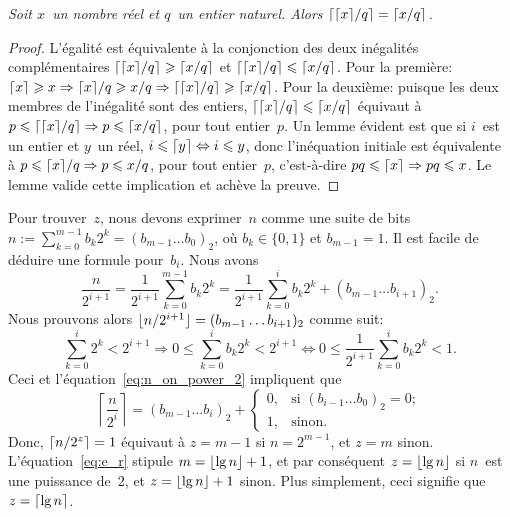 \begin{itemize}
    \medskip

\begin{thm}
\label{thm_ceilings}
\textsl{Soit \(x\)~un nom\-bre réel et \(q\)~un entier naturel. Alors
  \(\lceil{\lceil{x}\rceil/q}\rceil = \lceil{x/q}\rceil\).}
\end{thm}
\begin{proof}
  L'égalité est équivalente à la conjonction des deux inégalités
  complémentaires \(\lceil{\lceil{x}\rceil/q}\rceil \geqslant \lceil{x/q}\rceil\)
  et \(\lceil{\lceil{x}\rceil/q}\rceil \leqslant \lceil{x/q}\rceil\). Pour la
  première: \(\lceil{x}\rceil \geqslant x \Rightarrow \lceil{x}\rceil/q
  \geqslant x/q \Rightarrow \lceil{\lceil{x}\rceil/q}\rceil \geqslant
  \lceil{x/q}\rceil\). Pour la deuxième: puisque les deux membres de
  l'inégalité sont des entiers, \(\lceil{\lceil{x}\rceil/q}\rceil \leqslant
  \lceil{x/q}\rceil\) équivaut à \(p \leqslant \lceil{\lceil{x}\rceil/q}\rceil
  \Rightarrow p \leqslant \lceil{x/q}\rceil\), pour tout entier~\(p\). Un
  lemme évident est que si \(i\)~est un entier et \(y\)~un réel, \(i
  \leqslant \lceil{y}\rceil \Leftrightarrow i \leqslant y\), donc
  l'inéquation initiale est équivalente à \(p \leqslant \lceil{x}\rceil/q
  \Rightarrow p \leqslant x/q\), pour tout entier~\(p\), c'est-à-dire
  \(pq \leqslant \lceil{x}\rceil \Rightarrow pq \leqslant x\). Le lemme
  valide cette implication et achève la preuve.
 \end{proof}
    \noindent Pour trouver~\(z\), nous devons exprimer~\(n\) comme une
    suite de bits \(n :=\! \sum_{k=0}^{m-1}{b_k2^k} = (b_{m-1}\ldots
    b_0)_2\), où \(b_k \in \{0,1\}\) et \(b_{m-1} = 1\). Il est facile
    de déduire une formule pour~\(b_i\). Nous avons
    \begin{equation}
      \frac{n}{2^{i+1}}
      = \frac{1}{2^{i+1}}\sum_{k=0}^{m-1}{b_k2^{k}}
      = \frac{1}{2^{i+1}}\sum_{k=0}^{i}{b_k2^k} + (b_{m-1}\dots b_{i+1})_2.
      \label{eq:n_on_power_2}
    \end{equation}
    Nous prouvons alors \(\lfloor{n/2^{i+1}}\rfloor = (b_{m-1}\dots
    b_{i+1})_2\) comme suit:
    \begin{equation*}
      \sum_{k=0}^{i}{2^k} < 2^{i+1}
      \Rightarrow
      0 \leqslant \sum_{k=0}^{i}{b_k2^k} < 2^{i+1}
      \Leftrightarrow
      0 \leqslant \frac{1}{2^{i+1}}\sum_{k=0}^{i}{b_k2^k} < 1.
    \end{equation*}
    Ceci et l'équation~\eqref{eq:n_on_power_2} impliquent que
    \begin{equation*}
      \left\lceil\frac{n}{2^i}\right\rceil =
      (b_{m-1}\dots b_i)_2
      + \begin{cases}
          0, & \text{si \((b_{i-1}\dots b_0)_2=0\)};\\
          1, & \text{sinon}.
        \end{cases}
    \end{equation*}
    Donc, \(\lceil{n/2^z}\rceil = 1\) équivaut à \(z=m-1\) si
    \(n=2^{m-1}\), et \(z=m\) sinon. L'équation~\eqref{eq:e_r}
     stipule \(m = \lfloor{\lg n}\rfloor + 1\), et par
    conséquent \(z=\lfloor{\lg n}\rfloor\) si \(n\)~est une puissance
    de~\(2\), et \(z=\lfloor{\lg n}\rfloor + 1\) sinon. Plus simplement, ceci
    signifie que \(z=\lceil{\lg n}\rceil\).


\end{itemize}
